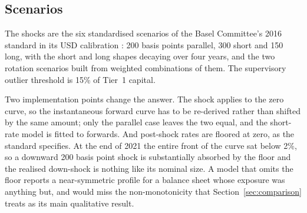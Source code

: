 \subsection{Scenarios}

The shocks are the six standardised scenarios of the Basel Committee's 2016 standard
in its USD calibration \citep{BCBS2016}: 200 basis points parallel, 300 short and 150
long, with the short and long shapes decaying over four years, and the two rotation
scenarios built from weighted combinations of them. The supervisory outlier threshold
is 15\% of Tier~1 capital.

Two implementation points change the answer. The shock applies to the zero curve, so
the instantaneous forward curve has to be re-derived rather than shifted by the same
amount; only the parallel case leaves the two equal, and the short-rate model is
fitted to forwards. And post-shock rates are floored at zero, as the standard
specifies. At the end of 2021 the entire front of the curve sat below 2\%, so a
downward 200 basis point shock is substantially absorbed by the floor and the realised
down-shock is nothing like its nominal size. A model that omits the floor reports a
near-symmetric profile for a balance sheet whose exposure was anything but, and would
miss the non-monotonicity that Section~\ref{sec:comparison} treats as its main
qualitative result.
